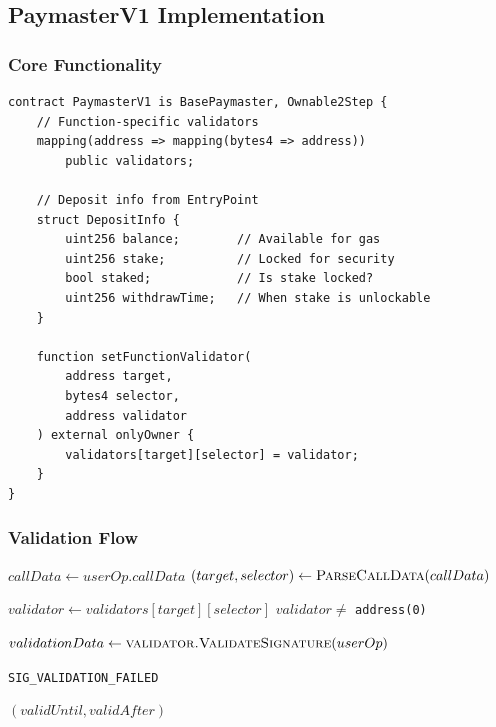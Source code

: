 \subsection{PaymasterV1 Implementation}

\subsubsection{Core Functionality}

\begin{lstlisting}[caption=Paymaster Core Structure]
contract PaymasterV1 is BasePaymaster, Ownable2Step {
    // Function-specific validators
    mapping(address => mapping(bytes4 => address))
        public validators;

    // Deposit info from EntryPoint
    struct DepositInfo {
        uint256 balance;        // Available for gas
        uint256 stake;          // Locked for security
        bool staked;            // Is stake locked?
        uint256 withdrawTime;   // When stake is unlockable
    }

    function setFunctionValidator(
        address target,
        bytes4 selector,
        address validator
    ) external onlyOwner {
        validators[target][selector] = validator;
    }
}
\end{lstlisting}

\subsubsection{Validation Flow}

\begin{algorithm}
\caption{Paymaster Validation}
\begin{algorithmic}[1]
    \State $callData \gets userOp.callData$
    \State $(target, selector) \gets \Call{ParseCallData}{callData}$

    \State $validator \gets validators[target][selector]$
    \Require $validator \neq$ \texttt{address(0)}

    \State $validationData \gets \Call{validator.ValidateSignature}{userOp}$

        \State \Return \texttt{SIG\_VALIDATION\_FAILED}
    \EndIf

    \State \Return $(validUntil, validAfter)$
\EndFunction
\end{algorithmic}
\end{algorithm}

